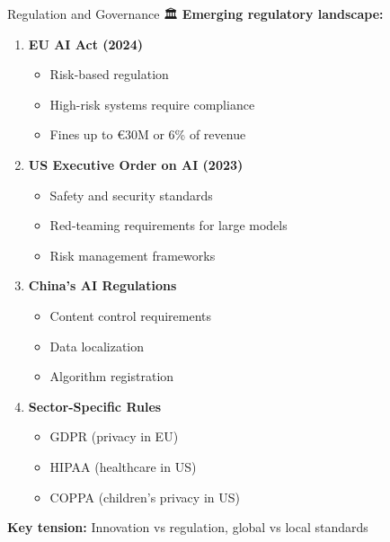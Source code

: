 \documentclass[aspectratio=169]{beamer}
\begin{document}
\begin{frame}[shrink=10]{Regulation and Governance 🏛️}
\textbf{Emerging regulatory landscape:}

\vspace{0.5em}

\begin{enumerate}\setlength{\itemsep}{0pt}
    \item \textbf{EU AI Act (2024)}
    \begin{itemize}\setlength{\itemsep}{0pt}
        \item Risk-based regulation
        \item High-risk systems require compliance
        \item Fines up to €30M or 6\% of revenue
    \end{itemize}

    \item \textbf{US Executive Order on AI (2023)}
    \begin{itemize}\setlength{\itemsep}{0pt}
        \item Safety and security standards
        \item Red-teaming requirements for large models
        \item Risk management frameworks
    \end{itemize}

    \item \textbf{China's AI Regulations}
    \begin{itemize}\setlength{\itemsep}{0pt}
        \item Content control requirements
        \item Data localization
        \item Algorithm registration
    \end{itemize}

    \item \textbf{Sector-Specific Rules}
    \begin{itemize}\setlength{\itemsep}{0pt}
        \item GDPR (privacy in EU)
        \item HIPAA (healthcare in US)
        \item COPPA (children's privacy in US)
    \end{itemize}
\end{enumerate}

\vspace{0.3em}

\textbf{Key tension:} Innovation vs regulation, global vs local standards
\end{frame}
\end{document}
